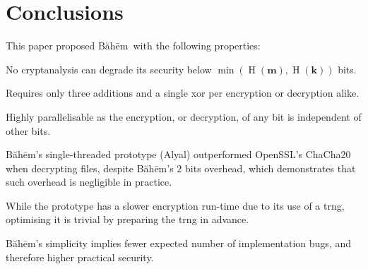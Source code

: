 \documentclass[twocolumn,hidelinks]{article}
\newcommand{\baheem}{Băhēm}
\DeclareMathOperator{\entropy}{H}
\begin{document}
\section{Conclusions}
This paper proposed \baheem\ with the following properties:
\begin{description}[itemsep=0em]
    \item[Secure.] No cryptanalysis can degrade its
        security below $\min(\entropy(\mathbf{m}), \entropy(\mathbf{k}))$
        bits.

    \item[Fast.] Requires only three additions and a single \gls{xor} per
        encryption or decryption alike.

        Highly parallelisable as the encryption, or decryption, of any bit
        is independent of other bits.

        \baheem's single-threaded prototype (Alyal) outperformed OpenSSL's
        ChaCha20 when decrypting files, despite \baheem's $2$ bits
        overhead, which demonstrates that such overhead is negligible in
        practice.

        While the prototype has a slower encryption run-time due to its use
        of a \gls{trng}, optimising it is trivial by preparing the
        \gls{trng} in advance.

    \item[Simple.] \baheem's simplicity implies fewer expected number of
        implementation bugs, and therefore higher practical security.
\end{description}



\end{document}

